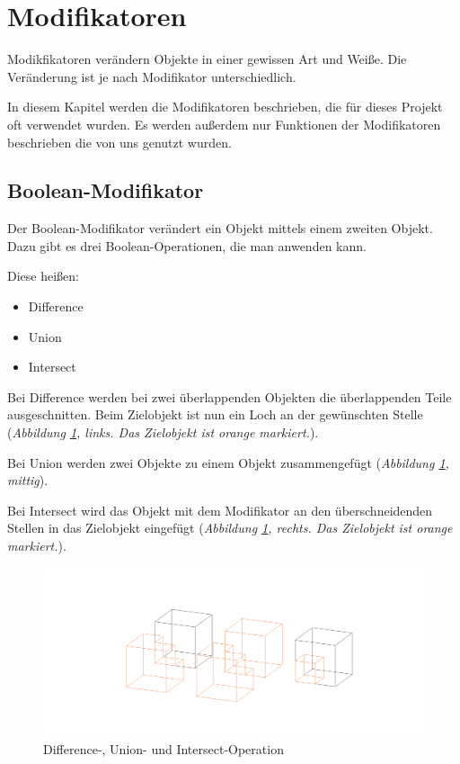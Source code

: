 \section{Modifikatoren}
Modikfikatoren verändern Objekte in einer gewissen Art und Weiße. Die Veränderung ist je nach Modifikator unterschiedlich.

In diesem Kapitel werden die Modifikatoren beschrieben, die für dieses Projekt oft verwendet wurden.
Es werden außerdem nur Funktionen der Modifikatoren beschrieben die von uns genutzt wurden.

\subsection{Boolean-Modifikator}
\label{Boolean:heading}
Der Boolean-Modifikator verändert ein Objekt mittels einem zweiten Objekt. Dazu gibt es
drei Boolean-Operationen, die man anwenden kann.\citep{blender:boolean_modifier}

Diese heißen:
\begin{itemize}
    \item  Difference
    \item  Union
    \item  Intersect
\end{itemize}

Bei Difference werden bei zwei überlappenden Objekten die überlappenden Teile ausgeschnitten. Beim Zielobjekt ist nun ein Loch an der gewünschten Stelle (\textit{Abbildung \ref{modifikatoren:image1}, links. Das Zielobjekt ist orange markiert.}).

Bei Union werden zwei Objekte zu einem Objekt zusammengefügt (\textit{Abbildung \ref{modifikatoren:image1}, mittig}).

Bei Intersect wird das Objekt mit dem Modifikator an den überschneidenden Stellen in das Zielobjekt eingefügt (\textit{Abbildung \ref{modifikatoren:image1}, rechts. Das Zielobjekt ist orange markiert.}).

\begin{figure}[h]
    \centering
    \includegraphics[width=.8\textwidth]{images/Modifikatoren-Boolean.png}
    \caption{Difference-, Union- und Intersect-Operation}
    \label{modifikatoren:image1}
\end{figure}

